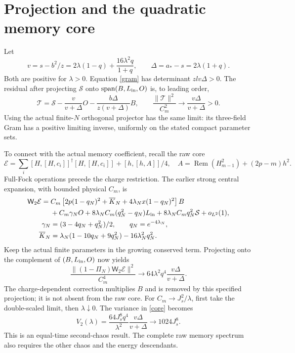 \documentclass[11pt,a4paper]{article}
\newcommand{\Rem}{\operatorname{Rem}}
\newcommand{\W}{\mathsf W_2}
\begin{document}
\newpage
\section{Projection and the quadratic memory core}
Let
\begin{equation}
 v=s-b^2/z=2\lambda(1-q)+\frac{16\lambda^2q}{1+q},\qquad
 \Delta=a_*-s=2\lambda(1+q).
\end{equation}
Both are positive for $\lambda>0$. Equation \eqref{gram} has
determinant $zl v\Delta>0$. The residual after projecting
$\mathcal S$ onto $\operatorname{span}(B,L_{\rm in},O)$ is,
to leading order,
\begin{equation}
 \mathcal T=\mathcal S-\frac{v}{v+\Delta}O
             -\frac{b\Delta}{z(v+\Delta)}B,
 \qquad \frac{\|\mathcal T\|^2}{C_m^2}\to
                 \frac{v\Delta}{v+\Delta}>0.\label{residual}
\end{equation}
Using the actual finite-$N$ orthogonal projector has the same
limit: its three-field Gram has a positive limiting inverse,
uniformly on the stated compact parameter sets.

To connect with the actual memory coefficient, recall the raw core
\begin{equation}
 \mathcal E=\sum_i[H,[H,c_i]]^\dagger[H,[H,c_i]]
                         +[h,[h,A]]/4,
 \quad A=\Rem(H_{m-1}^2)+(2p-m)h^2.
\end{equation}
Full-Fock operations precede the charge restriction.
The earlier strong central expansion, with bounded physical $C_m$, is
\begin{align}
 \W\mathcal E={}&C_m\left[2p(1-q_N)^2+\overline K_N
                     +4\lambda_Nx(1-q_N)^2\right]B\notag\\
 &+C_m\gamma_N O+8\lambda_N C_m(q_N^2-q_N)L_{\rm in}
                         +8\lambda_N C_mq_N^2\mathcal S+o_{L^2}(1),\\
 \gamma_N&=(3-4q_N+q_N^2)/2,\qquad q_N=e^{-4\lambda_N},\notag\\
 \overline K_N&=\lambda_N(1-10q_N+9q_N^2)-16\lambda_N^2q_N^2.
 \notag
\end{align}
Keep the actual finite parameters in the growing conserved term.
Projecting onto the complement of $(B,L_{\rm in},O)$ now yields
\begin{equation}
 \frac{\|(1-\Pi_N)\W\mathcal E\|^2}{C_m^4}
 \longrightarrow64\lambda^2q^4\frac{v\Delta}{v+\Delta}.\label{core}
\end{equation}
The charge-dependent correction multiplies $B$ and is removed by
this specified projection; it is not absent from the raw core.
For $C_m\to J_s^2/\lambda$, first take the double-scaled limit,
then $\lambda\downarrow0$. The variance in \eqref{core} becomes
\begin{equation}
 V_2(\lambda)=\frac{64J_s^8q^4}{\lambda^2}
                  \frac{v\Delta}{v+\Delta}
       \longrightarrow1024J_s^8.
\end{equation}
This is an equal-time second-chaos result. The complete raw memory
spectrum also requires the other chaos and the energy descendants.
\end{document}
